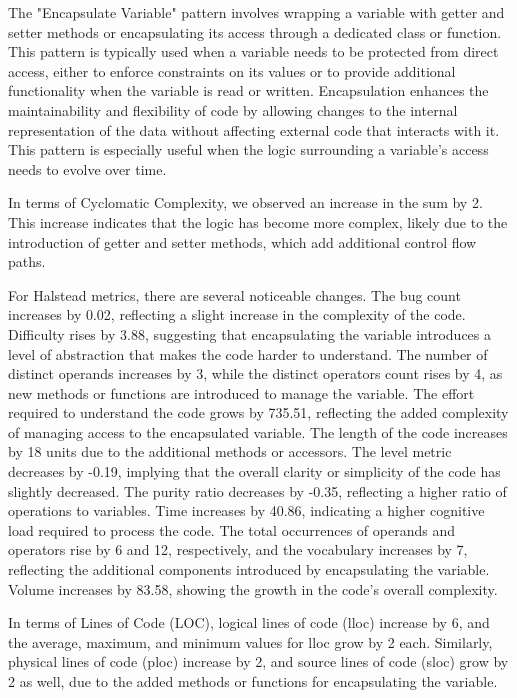 The "Encapsulate Variable" pattern involves wrapping a variable with getter and setter methods or encapsulating its access through a dedicated class or function. This pattern is typically used when a variable needs to be protected from direct access, either to enforce constraints on its values or to provide additional functionality when the variable is read or written. Encapsulation enhances the maintainability and flexibility of code by allowing changes to the internal representation of the data without affecting external code that interacts with it. This pattern is especially useful when the logic surrounding a variable's access needs to evolve over time.

In terms of Cyclomatic Complexity, we observed an increase in the sum by 2. This increase indicates that the logic has become more complex, likely due to the introduction of getter and setter methods, which add additional control flow paths.

For Halstead metrics, there are several noticeable changes. The bug count increases by 0.02, reflecting a slight increase in the complexity of the code. Difficulty rises by 3.88, suggesting that encapsulating the variable introduces a level of abstraction that makes the code harder to understand. The number of distinct operands increases by 3, while the distinct operators count rises by 4, as new methods or functions are introduced to manage the variable. The effort required to understand the code grows by 735.51, reflecting the added complexity of managing access to the encapsulated variable. The length of the code increases by 18 units due to the additional methods or accessors. The level metric decreases by -0.19, implying that the overall clarity or simplicity of the code has slightly decreased. The purity ratio decreases by -0.35, reflecting a higher ratio of operations to variables. Time increases by 40.86, indicating a higher cognitive load required to process the code. The total occurrences of operands and operators rise by 6 and 12, respectively, and the vocabulary increases by 7, reflecting the additional components introduced by encapsulating the variable. Volume increases by 83.58, showing the growth in the code's overall complexity.

In terms of Lines of Code (LOC), logical lines of code (lloc) increase by 6, and the average, maximum, and minimum values for lloc grow by 2 each. Similarly, physical lines of code (ploc) increase by 2, and source lines of code (sloc) grow by 2 as well, due to the added methods or functions for encapsulating the variable.

